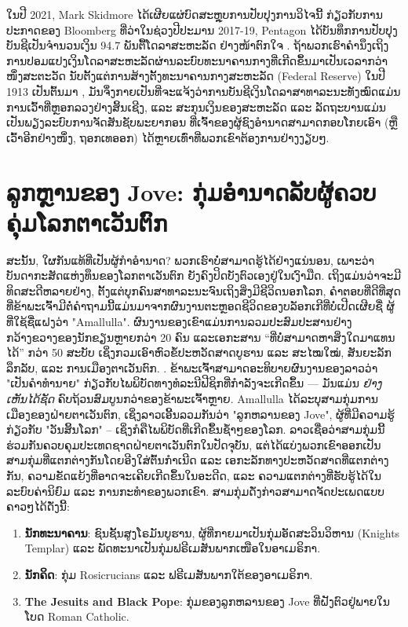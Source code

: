\documentclass[10pt,twocolumn,letterpaper]{article}
\begin{document}
ໃນປີ 2021, Mark Skidmore ໄດ້ເຜີຍແຜ່ບົດສະຫຼຸບການປັບປຸງການວິໄຈນີ້ ກ່ຽວກັບການປະກາດຂອງ Bloomberg ທີ່ວ່າໃນຊ່ວງປີປະມານ 2017-19, Pentagon ໄດ້ບັນທຶກການປັບປຸງບັນຊີເປັນຈຳນວນເງິນ 94.7 ພັນຕື້ໂດລາສະຫະລັດ ຢ່າງໜ້າຕົກໃຈ \cite{17,18}.
ຖ້າພວກເຮົາຄໍານຶງເຖິງການປອມແປງເງິນໂດລາສະຫະລັດຜ່ານລະບົບທະນາຄານກາງທີ່ເກີດຂຶ້ນມາເປັນເວລາກວ່າໜຶ່ງສະຕະວັດ ນັບຕັ້ງແຕ່ການສ້າງຕັ້ງທະນາຄານກາງສະຫະລັດ (Federal Reserve) ໃນປີ 1913 ເປັນຕົ້ນມາ \cite{37}, ມັນຈຶ່ງກາຍເປັນທີ່ຈະແຈ້ງວ່າການບັນຊີເງິນໂດລາສາທາລະນະທັງໝົດແມ່ນການເວົ້າທີ່ຫຼອກລວງຢ່າງສິ້ນເຊີງ, ແລະ ສະກຸນເງິນຂອງສະຫະລັດ ແລະ ລັດຖະບານແມ່ນເປັນພຽງລະບົບການຈັດສັນຊັບພະຍາກອນ ທີ່ເຈົ້າຂອງຜູ້ຊົງອຳນາດສາມາດກອບໂກຍເອົາ (ຫຼືເວົ້າອີກຢ່າງໜຶ່ງ, ຖອກເທອອກ) ໄດ້ຫຼາຍເທົ່າທີ່ພວກເຂົາຕ້ອງການຢ່າງງຽບໆ. 
\section{ລູກຫຼານຂອງ Jove: ກຸ່ມອຳນາດລັບຜູ້ຄວບຄຸ່ມໂລກຕາເວັນຕົກ}

ສະນັ້ນ, ໃຜກັນແທ້ທີ່ເປັນຜູ້ກຳອຳນາດ? 
ພວກເຮົາບໍ່ສາມາດຮູ້ໄດ້ຢ່າງແນ່ນອນ, ເພາະວ່າບັນດາກະສັດແຫ່ງທຶນຂອງໂລກຕາເວັນຕົກ ຍັງຄົງປິດບັງຕົວເອງຢູ່ໃນເງົາມືດ. ເຖິງແມ່ນວ່າຈະມີທິດສະດີຫລາຍຢ່າງ, ຕັ້ງແຕ່ບຸກຄົນສາທາລະນະຈົນເຖິງສິ່ງມີຊີວິດນອກໂລກ, ຄໍາຕອບທີ່ດີທີ່ສຸດທີ່ຂ້າພະເຈົ້າມີຕໍ່ຄໍາຖາມນີ້ແມ່ນມາຈາກຜົນງານຕະຫຼອດຊີວິດຂອງບລັອກເກີທີ່ບໍ່ເປີດເຜີຍຊື່ ຜູ້ທີ່ໃຊ້ຊື່ແຝງວ່າ "Amallulla". ຜົນງານຂອງເຂົາແມ່ນການລວມປະສົມປະສານຢ່າງກວ້າງຂວາງຂອງນັກຂຽນຫຼາຍກວ່າ 20 ຄົນ ແລະເອກະສານ “ທີ່ບໍ່ສາມາດຫາສິ່ງໃດມາແທນໄດ້” ກວ່າ 50 ສະບັບ ເຊິ່ງກວມເອົາຫົວຂໍ້ປະຫວັດສາດບູຮານ ແລະ ສະໄໝໃໝ່, ສັນຍະລັກລຶກລັບ, ແລະ ການເມືອງຕາເວັນຕົກ. \cite{33,34}. ຂ້າພະເຈົ້າສາມາດອະທິບາຍຜົນງານຂອງລາວວ່າ "ເປັນຄໍາທໍານາຍ" ກ່ຽວກັບໄພພິບັດທາງທໍລະນີຟີຊິກທີ່ກຳລັງຈະເກີດຂຶ້ນ — ມັນແມ່ນ \textit{ຢ່າງເຫັນໄດ້ຊັດ} ຄົບຖ້ວນສົມບູນກວ່າຂອງຂ້າພະເຈົ້າຫຼາຍ. 
Amallulla ໄດ້ລະບຸສາມກຸ່ມການເມືອງຂອງຝ່າຍຕາເວັນຕົກ, ເຊິ່ງລາວເອີ້ນລວມກັນວ່າ "ລູກຫລານຂອງ Jove", ຜູ້ທີ່ມີຄວາມຮູ້ກ່ຽວກັບ "ວັນສິ້ນໂລກ" – ເຊິ່ງກໍຄືໄພພິບັດທີ່ເກີດຂຶ້ນຊ້ຳໆຂອງໂລກ. 
ລາວເຊື່ອວ່າສາມກຸ່ມນີ້ຮ່ວມກັນຄວບຄຸມປະເທດຊາດຝ່າຍຕາເວັນຕົກໃນປັດຈຸບັນ, ແຕ່ໄດ້ແບ່ງພວກເຂົາອອກເປັນສາມກຸ່ມທີ່ແຕກຕ່າງກັນໂດຍອີງໃສ່ຕົ້ນກຳເນີດ ແລະ ເອກະລັກທາງປະຫວັດສາດທີ່ແຕກຕ່າງກັນ, ຄວາມຂັດແຍ້ງທີ່ອາດຈະເຄີຍເກີດຂຶ້ນໃນອະດີດ, ແລະ ຄວາມແຕກຕ່າງທີ່ຮັບຮູ້ໄດ້ໃນລະບົບຄ່ານິຍົມ ແລະ ການກະທຳຂອງພວກເຂົາ. 
ສາມກຸ່ມດັ່ງກ່າວສາມາດຈັດປະເພດແບບຄາວໆໄດ້ດັ່ງນີ້:

\begin{flushleft}
\begin{enumerate}
    \item \textbf{ນັກທະນາຄານ}: ຊົນຊັ້ນສູງໂຣມັນບູຮານ, ຜູ້ທີ່ກາຍມາເປັນກຸ່ມອັດສະວິນວິຫານ (Knights Templar) ແລະ ພັດທະນາເປັນກຸ່ມຟຣີເມສັນພາກເໜືອໃນອາເມຣິກາ.
    \item \textbf{ນັກຄິດ}: ກຸ່ມ Rosicrucians ແລະ ຟຣີເມສັນພາກໃຕ້ຂອງອາເມຣິກາ. 
    \item \textbf{The Jesuits and Black Pope}: ກຸ່ມຂອງລູກຫລານຂອງ Jove ທີ່ຝັງຕົວຢູ່ພາຍໃນໂບດ Roman Catholic. 
\end{enumerate}
\end{flushleft}
\end{document}
